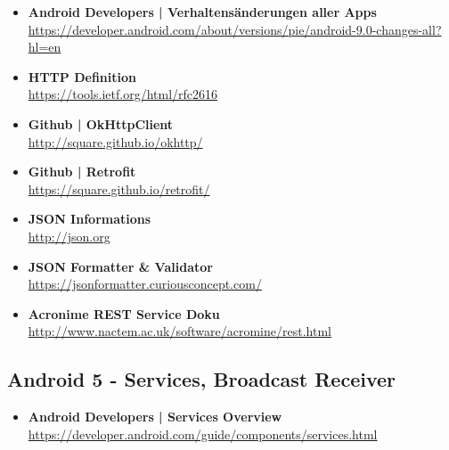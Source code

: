 \documentclass[a4paper]{article}
\begin{document}
{\begin{itemize}
		\item \textbf{Android Developers | Verhaltensänderungen aller Apps}\\
		\href{https://developer.android.com/about/versions/pie/android-9.0-changes-all?hl=en}
		{https://developer.android.com/about/versions/pie/android-9.0-changes-all?hl=en}
		
		\item \textbf{HTTP Definition}\\
		\href{https://tools.ietf.org/html/rfc2616}
		{https://tools.ietf.org/html/rfc2616}
		
		\item \textbf{Github | OkHttpClient}\\
		\href{http://square.github.io/okhttp/}
		{http://square.github.io/okhttp/}
		
		\item \textbf{Github | Retrofit}\\
		\href{https://square.github.io/retrofit/}
		{https://square.github.io/retrofit/}
		
		\item \textbf{JSON Informations}\\
		\href{http://json.org}
		{http://json.org}
		
		\item \textbf{JSON Formatter \& Validator}\\
		\href{https://jsonformatter.curiousconcept.com/}
		{https://jsonformatter.curiousconcept.com/}
		
		\item \textbf{Acronime REST Service Doku}\\
		\href{http://www.nactem.ac.uk/software/acromine/rest.html}
		{http://www.nactem.ac.uk/software/acromine/rest.html}
		
	\end{itemize}
	
	\subsection{Android 5 - Services, Broadcast Receiver}
	
	\begin{itemize}
		
		\item \textbf{Android Developers | Services Overview}\\
		\href{https://developer.android.com/guide/components/services.html}
		{https://developer.android.com/guide/components/services.html}
		

\end{itemize}}
\end{document}
